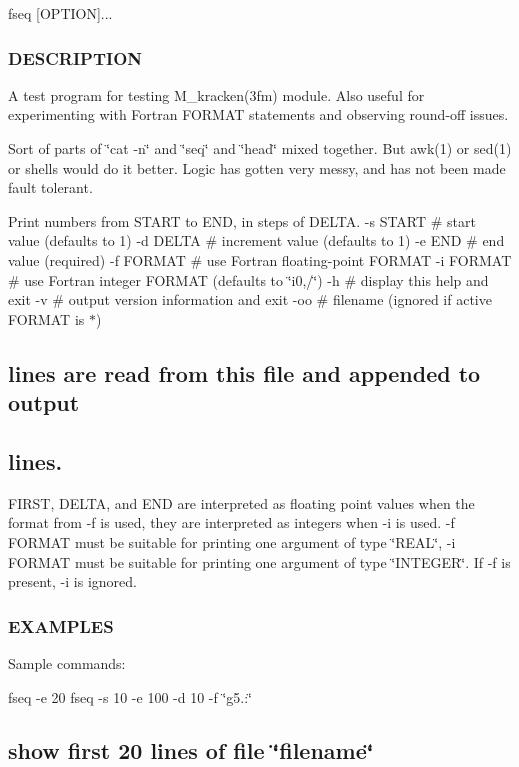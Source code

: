 fseq \mbox{[}O\+P\+T\+I\+ON\mbox{]}... \subsubsection*{D\+E\+S\+C\+R\+I\+P\+T\+I\+ON}

A test program for testing M\+\_\+kracken(3fm) module. Also useful for experimenting with Fortran F\+O\+R\+M\+AT statements and observing round-\/off issues.

Sort of parts of \char`\"{}cat -\/n\char`\"{} and \char`\"{}seq\char`\"{} and \char`\"{}head\char`\"{} mixed together. But awk(1) or sed(1) or shells would do it better. Logic has gotten very messy, and has not been made fault tolerant.

Print numbers from S\+T\+A\+RT to E\+ND, in steps of D\+E\+L\+TA. -\/s S\+T\+A\+RT \# start value (defaults to 1) -\/d D\+E\+L\+TA \# increment value (defaults to 1) -\/e E\+ND \# end value (required) -\/f F\+O\+R\+M\+AT \# use Fortran floating-\/point F\+O\+R\+M\+AT -\/i F\+O\+R\+M\+AT \# use Fortran integer F\+O\+R\+M\+AT (defaults to \char`\"{}i0,/\char`\"{}) -\/h \# display this help and exit -\/v \# output version information and exit -\/oo \# filename (ignored if active F\+O\+R\+M\+AT is $\ast$) \subsection*{lines are read from this file and appended to output}

\subsection*{lines.}

F\+I\+R\+ST, D\+E\+L\+TA, and E\+ND are interpreted as floating point values when the format from -\/f is used, they are interpreted as integers when -\/i is used. -\/f F\+O\+R\+M\+AT must be suitable for printing one argument of type \char`\"{}\+R\+E\+A\+L\char`\"{}, -\/i F\+O\+R\+M\+AT must be suitable for printing one argument of type \char`\"{}\+I\+N\+T\+E\+G\+E\+R\char`\"{}. If -\/f is present, -\/i is ignored. \subsubsection*{E\+X\+A\+M\+P\+L\+ES}

Sample commands\+:

fseq -\/e 20 fseq -\/s 10 -\/e 100 -\/d 10 -\/f \char`\"{}g5.\textquotesingle{}\textquotesingle{}\+:\textquotesingle{}\textquotesingle{}\char`\"{} \subsection*{show first 20 lines of file \char`\"{}filename\char`\"{}}


